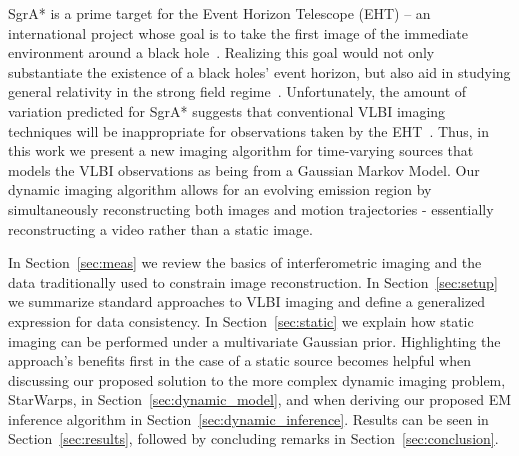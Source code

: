 SgrA* is a prime target for the Event Horizon Telescope (EHT) -- an international project whose goal is to take the first image of the immediate environment around a black hole~\cite{Doeleman_2009}.
Realizing this goal would not only substantiate the existence of a black holes' event horizon, but also aid in studying general relativity in the strong field regime~\cite{Doeleman_2008, Johannsen_2010}.
Unfortunately, the amount of variation predicted for SgrA* suggests that conventional VLBI imaging techniques will be inappropriate for observations taken by the EHT~\cite{rusenimaging,orbitalperiod}. 
Thus, in this work we present a new imaging algorithm for time-varying sources that models the VLBI observations as being from a Gaussian Markov Model. %
Our dynamic imaging algorithm allows for an evolving emission region by simultaneously reconstructing both images and motion trajectories - essentially reconstructing a video rather than a static image.

In Section~\ref{sec:meas} we review the basics of interferometric imaging and the data traditionally used to constrain image reconstruction. In Section~\ref{sec:setup} we summarize standard approaches to VLBI imaging and define a generalized expression for data consistency. In Section~\ref{sec:static} we explain how static imaging can be performed under a multivariate Gaussian prior. Highlighting the approach's benefits first in the case of a static source becomes helpful when discussing our proposed solution to the more complex dynamic imaging problem, StarWarps, in Section~\ref{sec:dynamic_model}, and when deriving our proposed EM inference algorithm in Section~\ref{sec:dynamic_inference}. Results can be seen in Section~\ref{sec:results}, followed by concluding remarks in Section~\ref{sec:conclusion}.


